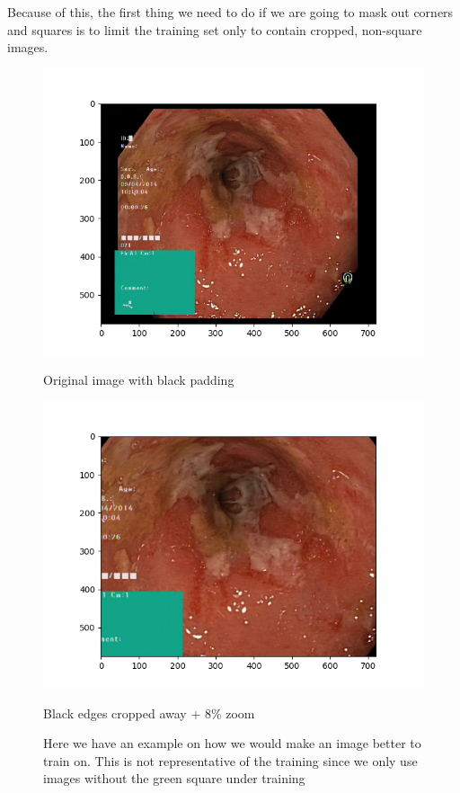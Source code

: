     Because of this, the first thing we need to do if we are going to mask out corners and squares is to limit the training set only to contain cropped, non-square images. 
 
    \begin{figure}[ht]
      \centering
      \begin{minipage}[b]{0.45\textwidth}
    \includegraphics[width=\textwidth]{background/figures/uncropped_img.png}
    \caption{Original image with black padding}
      \end{minipage}
      \hfill
      \begin{minipage}[b]{0.45\textwidth}
    \includegraphics[width=\textwidth]{background/figures/cropped_8percent_img.png}
    \caption{Black edges cropped away + 8\% zoom}
      \end{minipage}
      \caption{Here we have an example on how we would make an image better to train on. This is not representative of the training since we only use images without the green square under training}
    \end{figure}
    
